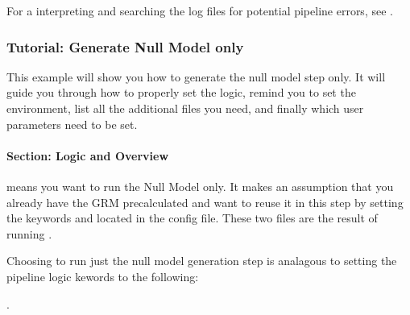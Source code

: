 \documentclass[letterpaper,10pt,english]{sphinxmanual}
\begin{document}


For a interpreting and searching the log files for potential pipeline errors, see {\hyperref[\detokenize{parsingStdErrOut::doc}]{}}.




\subsubsection{Tutorial: Generate Null Model only}
\label{\detokenize{generateNullonlyTutorial:tutorial-generate-null-model-only}}\label{\detokenize{generateNullonlyTutorial::doc}}
This example will show you how to generate the null model step only.  It will guide you through how to properly set the logic, remind you to set the environment, list all the additional files you need, and finally which user parameters need to be set.


\paragraph{Section: Logic and Overview}
\label{\detokenize{generateNullonlyTutorial:section-logic-and-overview}}
 means you want to run the Null Model only.  It makes an assumption that you already have the GRM pre\sphinxhyphen{}calculated and want to re\sphinxhyphen{}use it in this step by setting the keywords  and  located in the config file.  These two files are the result of running .

Choosing to run just the null model generation step is analagous to setting the pipeline logic kewords to the following:

\begin{sphinxVerbatim}[commandchars=\\\{\}]
\end{sphinxVerbatim}

        .
\end{document}

